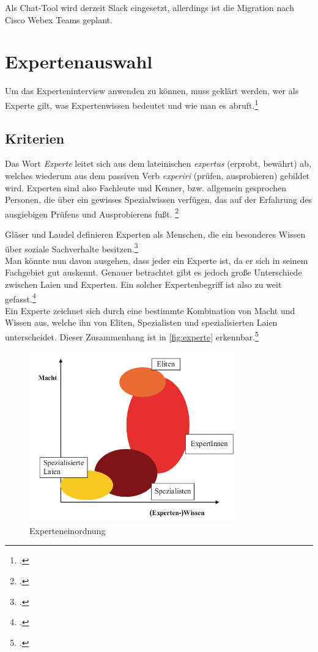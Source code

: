 Als Chat-Tool wird derzeit Slack eingesetzt, allerdings ist die Migration nach Cisco Webex Teams geplant. 


\section{Expertenauswahl}
Um das Experteninterview anwenden zu können, muss geklärt werden, wer als Experte gilt, was Expertenwissen bedeutet und wie man es abruft.\footcite[Vgl.][6\psq]{Bogner_2014_Interview}

\subsection{Kriterien}
Das Wort \textit{Experte} leitet sich aus dem lateinischen \textit{expertus} (erprobt, bewährt) ab, welches wiederum aus dem passiven Verb \textit{experiri} (prüfen, ausprobieren) gebildet wird. Experten sind also Fachleute und Kenner, bzw. allgemein gesprochen Personen, die über ein gewisses Spezialwissen verfügen, das auf der Erfahrung des ausgiebigen Prüfens und Ausprobierens fußt. \footcite[Vgl.][9]{Bogner_2014_Interview}

Gläser und Laudel definieren Experten als Menschen, die ein besonderes Wissen über soziale Sachverhalte besitzen.\footcite[Vgl.][12]{Glaeser_2010_Inhaltsanalyse}\\
Man könnte nun davon ausgehen, dass jeder ein Experte ist, da er sich in seinem Fachgebiet gut auskennt. Genauer betrachtet  gibt es jedoch große Unterschiede zwischen Laien und Experten. Ein solcher Expertenbegriff ist also zu weit gefasst.\footcite[Vgl.][10\psq]{Bogner_2014_Interview}\\
Ein Experte zeichnet sich durch eine bestimmte Kombination von Macht und Wissen aus, welche ihn von Eliten, Spezialisten und spezialisierten Laien unterscheidet. Dieser Zusammenhang ist in  \autoref{fig:experte} erkennbar.\footcite[Vgl.][o. \pno]{Littig_2008}

\begin{figure}[H]
  \centering
  \includegraphics[width=0.8\textwidth]{Anhang/Experte}
  \caption{Experteneinordnung}
\label{fig:experte}
\end{figure}

